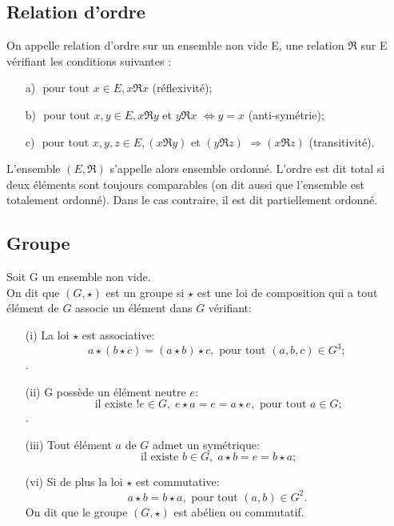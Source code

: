 \subsection{Relation d'ordre}
\begin{madefinition}
	On appelle relation d’ordre sur un ensemble non vide E, une relation
	$\Re $ sur E vérifiant les conditions suivantes :
	\begin{enumerate}
		\item[a)] $\text{ pour tout } x \in E, x\Re x$ (réflexivité);
		\item[b)] $\text{ pour tout } x,y \in E, x\Re y $ et $y\Re x$ $ \Longleftrightarrow y = x $ (anti-symétrie);
		\item[c)] $\text{ pour tout } x,y,z \in E, (x\Re y)$ et $(y\Re z)$ $\Longrightarrow (x\Re z)$  (transitivité).
	\end{enumerate}
	L'ensemble $(E, \Re )$ s'appelle alors ensemble ordonné. L'ordre est dit total si deux éléments sont toujours comparables (on dit aussi que l'ensemble est totalement ordonné). Dans le cas contraire, il est dit partiellement ordonné.
\end{madefinition}

\subsection{Groupe}
\begin{madefinition}
	Soit G un ensemble non vide.\\
	On dit que $(G, \star)$ est un groupe si $\star$ est une loi de composition qui a tout élément de $G$ associe un élément dans $G$ vérifiant:
	\begin{enumerate}
		\item[(i)] La loi $\star$ est associative: 
		\[ a\star(b\star c) = (a\star b) \star c, \text{ pour tout } (a,b,c) \in G^3;\].
		\item[(ii)] G possède un élément neutre $e$:
		\[ \text{ il existe }!e \in G,\; e\star a = e =  a\star e, \text{ pour tout } a \in G;\].
		\item[(iii)] Tout élément $a$ de $G$ admet un symétrique:
		\[ \text{ il existe }b \in G,\; a\star b = e = b \star a;\]
		\item [(vi)] Si de plus la loi $\star$ est commutative:
		\[ a\star b = b \star a, \text{ pour tout } (a,b) \in G^2.\]
		On dit que le groupe $(G,\star)$ est abélien ou commutatif.
	\end{enumerate}
\end{madefinition}
